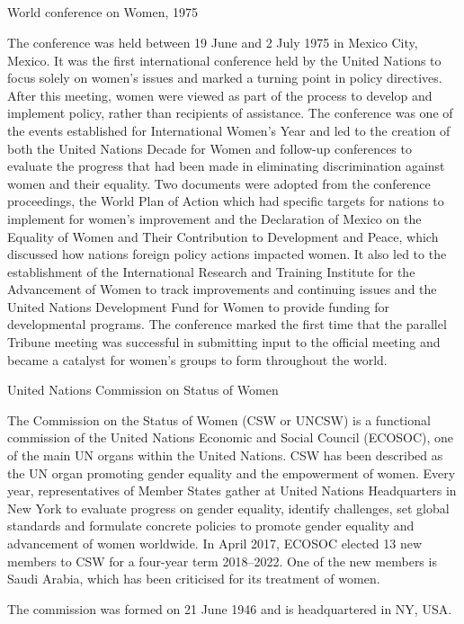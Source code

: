 \begin{questions}

\subsection*{
}

\question World conference on Women, 1975

\begin{solution}

The conference was held between 19 June and 2 July 1975 in Mexico City, Mexico. It was the first international conference held by the United Nations to focus solely on women's issues and marked a turning point in policy directives. After this meeting, women were viewed as part of the process to develop and implement policy, rather than recipients of assistance. The conference was one of the events established for International Women's Year and led to the creation of both the United Nations Decade for Women and follow-up conferences to evaluate the progress that had been made in eliminating discrimination against women and their equality. Two documents were adopted from the conference proceedings, the World Plan of Action which had specific targets for nations to implement for women's improvement and the Declaration of Mexico on the Equality of Women and Their Contribution to Development and Peace, which discussed how nations foreign policy actions impacted women. It also led to the establishment of the International Research and Training Institute for the Advancement of Women to track improvements and continuing issues and the United Nations Development Fund for Women to provide funding for developmental programs. The conference marked the first time that the parallel Tribune meeting was successful in submitting input to the official meeting and became a catalyst for women's groups to form throughout the world.

\end{solution}

\question United Nations Commission on Status of Women

\begin{solution}

The Commission on the Status of Women (CSW or UNCSW) is a functional commission of the United Nations Economic and Social Council (ECOSOC), one of the main UN organs within the United Nations. CSW has been described as the UN organ promoting gender equality and the empowerment of women. Every year, representatives of Member States gather at United Nations Headquarters in New York to evaluate progress on gender equality, identify challenges, set global standards and formulate concrete policies to promote gender equality and advancement of women worldwide. In April 2017, ECOSOC elected 13 new members to CSW for a four-year term 2018–2022. One of the new members is Saudi Arabia, which has been criticised for its treatment of women.

The commission was formed on 21 June 1946 and is headquartered in NY, USA.

\end{solution}

\end{questions}
